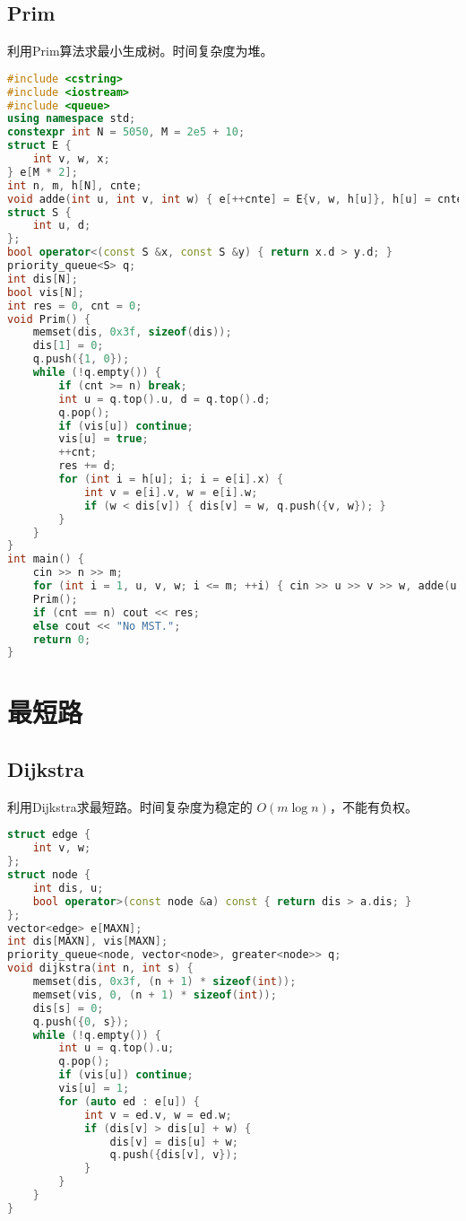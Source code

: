 \documentclass[9pt, a4paper, oneside]{book}
\begin{document}
\subsection{Prim}
利用Prim算法求最小生成树。时间复杂度为堆。
\begin{lstlisting}[language={C++}]
#include <cstring>
#include <iostream>
#include <queue>
using namespace std;
constexpr int N = 5050, M = 2e5 + 10;
struct E {
    int v, w, x;
} e[M * 2];
int n, m, h[N], cnte;
void adde(int u, int v, int w) { e[++cnte] = E{v, w, h[u]}, h[u] = cnte; }
struct S {
    int u, d;
};
bool operator<(const S &x, const S &y) { return x.d > y.d; }
priority_queue<S> q;
int dis[N];
bool vis[N];
int res = 0, cnt = 0;
void Prim() {
    memset(dis, 0x3f, sizeof(dis));
    dis[1] = 0;
    q.push({1, 0});
    while (!q.empty()) {
        if (cnt >= n) break;
        int u = q.top().u, d = q.top().d;
        q.pop();
        if (vis[u]) continue;
        vis[u] = true;
        ++cnt;
        res += d;
        for (int i = h[u]; i; i = e[i].x) {
            int v = e[i].v, w = e[i].w;
            if (w < dis[v]) { dis[v] = w, q.push({v, w}); }
        }
    }
}
int main() {
    cin >> n >> m;
    for (int i = 1, u, v, w; i <= m; ++i) { cin >> u >> v >> w, adde(u, v, w), adde(v, u, w); }
    Prim();
    if (cnt == n) cout << res;
    else cout << "No MST.";
    return 0;
}\end{lstlisting}
\section{最短路}
\subsection{Dijkstra}
利用Dijkstra求最短路。时间复杂度为稳定的 $O(m \log n)$，不能有负权。
\begin{lstlisting}[language={C++}]
struct edge {
    int v, w;
};
struct node {
    int dis, u;
    bool operator>(const node &a) const { return dis > a.dis; }
};
vector<edge> e[MAXN];
int dis[MAXN], vis[MAXN];
priority_queue<node, vector<node>, greater<node>> q;
void dijkstra(int n, int s) {
    memset(dis, 0x3f, (n + 1) * sizeof(int));
    memset(vis, 0, (n + 1) * sizeof(int));
    dis[s] = 0;
    q.push({0, s});
    while (!q.empty()) {
        int u = q.top().u;
        q.pop();
        if (vis[u]) continue;
        vis[u] = 1;
        for (auto ed : e[u]) {
            int v = ed.v, w = ed.w;
            if (dis[v] > dis[u] + w) {
                dis[v] = dis[u] + w;
                q.push({dis[v], v});
            }
        }
    }
}\end{lstlisting}
\end{document}
